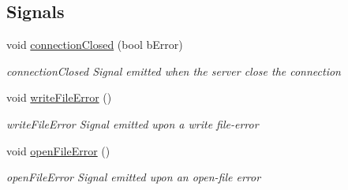 \subsection*{Signals}
\begin{DoxyCompactItemize}
\item 
void \mbox{\hyperlink{classFileUpdater_af460a6c15c3d606b7206650112477a28}{connection\+Closed}} (bool b\+Error)
\begin{DoxyCompactList}\small\item\em connection\+Closed Signal emitted when the server close the connection \end{DoxyCompactList}\item 
\mbox{\label{classFileUpdater_a95c2170781d8e727720cb1dbd8c5e350}} 
void \mbox{\hyperlink{classFileUpdater_a95c2170781d8e727720cb1dbd8c5e350}{write\+File\+Error}} ()
\begin{DoxyCompactList}\small\item\em write\+File\+Error Signal emitted upon a write file-\/error \end{DoxyCompactList}\item 
\mbox{\label{classFileUpdater_a1891cde11d15a41d8a4282a73fa9598c}} 
void \mbox{\hyperlink{classFileUpdater_a1891cde11d15a41d8a4282a73fa9598c}{open\+File\+Error}} ()
\begin{DoxyCompactList}\small\item\em open\+File\+Error Signal emitted upon an open-\/file error \end{DoxyCompactList}\end{DoxyCompactItemize}
